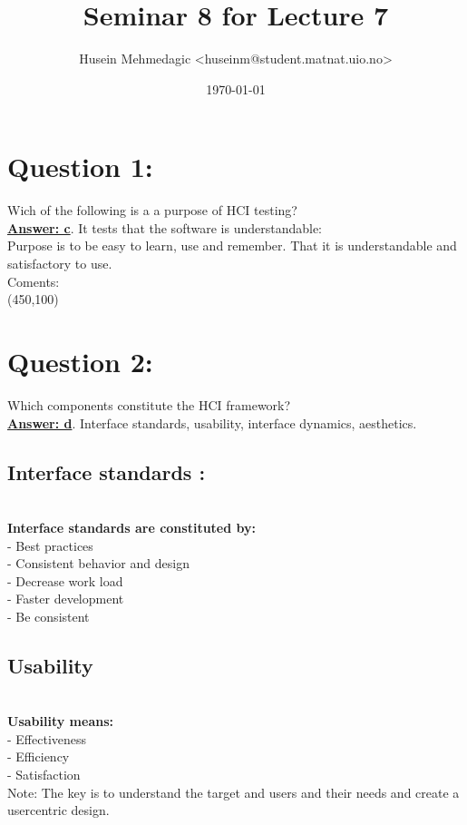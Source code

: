 \documentclass[12pt,a4paper,norsk]{article}
\title{Seminar 8 for Lecture 7}
\author{Husein Mehmedagic <huseinm@student.matnat.uio.no>}
\date{\today}
\begin{document}
\maketitle
\noindent \section {Question 1:} Wich of the following is a a purpose of HCI testing?\\
\underline {\textbf{Answer: c}}. It tests that the software  is understandable:\\
\indent Purpose is to be easy to learn, use and remember. That it is understandable and satisfactory to use.\\
\noindent Coments:\\
\framebox(450,100){}\\

\noindent \section{ Question 2:} Which components constitute the HCI framework?\\
\underline{\textbf{Answer: d}}. Interface standards, usability, interface dynamics, aesthetics.
\subsection{Interface standards :} \\
\indent \textbf{Interface standards are constituted by:}\\
\indent - Best practices\\
\indent - Consistent behavior and design\\
\indent - Decrease work load\\
\indent - Faster development\\
\indent - Be consistent

\subsection{Usability}\\
\textbf{Usability means:}\\
\indent - Effectiveness\\
\indent - Efficiency\\
\indent - Satisfaction\\

\noindent Note: The key is to understand the target and users and their needs and create a usercentric design.\\
\end{document}

